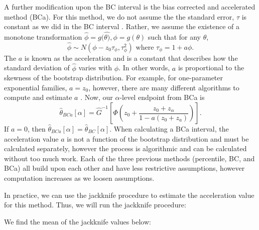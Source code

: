 \documentclass[12pt]{article}
\newenvironment{Shaded}{\begin{snugshade}}{\end{snugshade}}
\newcommand{\ControlFlowTok}[1]{\textcolor[rgb]{0.13,0.29,0.53}{\textbf{#1}}}
\newcommand{\FunctionTok}[1]{\textcolor[rgb]{0.00,0.00,0.00}{#1}}
\newcommand{\NormalTok}[1]{#1}
\newcommand{\OtherTok}[1]{\textcolor[rgb]{0.56,0.35,0.01}{#1}}
\newcommand{\SpecialCharTok}[1]{\textcolor[rgb]{0.00,0.00,0.00}{#1}}
\begin{document}
A further modification upon the BC interval is the bias corrected and
accelerated method (BCa). For this method, we do not assume the the
standard error, \(\tau\) is constant as we did in the BC interval
\citep[\citet{EfronCasi}]{Efron86}. Rather, we assume the existence of a
monotone transformation
\(\hat{\phi} = g(\hat{\theta)}, \phi = g(\theta)\) such that for any
\(\theta\),
\[\hat{\phi} \sim N(\phi - z_0\tau_\phi, \tau_\phi^2) \text{ where } \tau_\phi = 1+ a\phi.\]
The \(a\) is known as the acceleration and is a constant that describes
how the standard deviation of \(\hat{\phi}\) varies with \(\phi\). In
other words, \(a\) is proportional to the skewness of the bootstrap
distribution. For example, for one-parameter exponential families,
\(a=z_0\), however, there are many different algorithms to compute and
estimate \(a\) \citep{Flowers18}. Now, our \(\alpha\)-level endpoint
from BCa is
\[\hat{\theta}_{BCa}[\alpha] = \hat{G}^{-1} \left [ \Phi \left ( z_0 + \frac{z_0+z_\alpha}{1-a(z_0+z_a)} \right ) \right ].\]
If \(a = 0\), then
\(\hat{\theta}_{BCa}[\alpha] = \hat{\theta}_{BC}[\alpha].\) When
calculating a BCa interval, the acceleration value \(a\) is not a
function of the bootstrap distribution and must be calculated
separately, however the process is algorithmic and can be calculated
without too much work. Each of the three previous methods (percentile,
BC, and BCa) all build upon each other and have less restrictive
assumptions, however computation increases as we loosen assumptions.

In practice, we can use the jackknife procedure to estimate the
acceleration value for this method. Thus, we will run the jackknife
procedure:

\begin{Shaded}
\end{Shaded}

We find the mean of the jackknife values below:

\begin{Shaded}
\end{Shaded}
\end{document}
